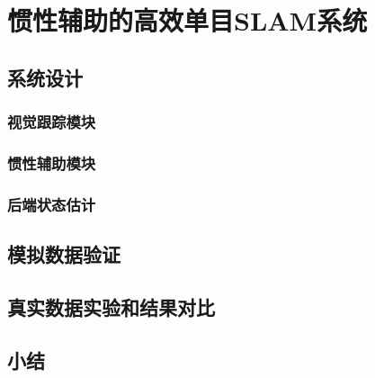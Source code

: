 \chapter{惯性辅助的高效单目SLAM系统}

\section{系统设计}

\subsection{视觉跟踪模块}
\subsection{惯性辅助模块}
\subsection{后端状态估计}

\section{模拟数据验证}

\section{真实数据实验和结果对比}

\section{小结}
